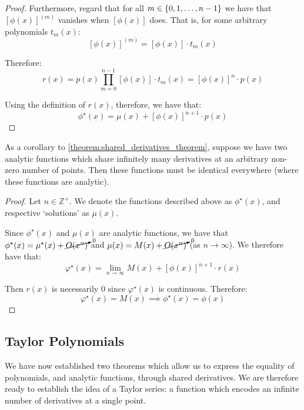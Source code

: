 \begin{theorem}
\begin{proof}
        Furthermore, regard that for all $m\in\{0,1,\dots,n-1\}$ we have that $[\phi(x)]^{(m)}$ vanishes when $[\phi(x)]$ does. That is, for some arbitrary polynomials $t_m(x)$:
        $$
            [\phi(x)]^{(m)}=[\phi(x)]\cdot t_m(x)
        $$

        Therefore:
        $$
            r(x) = p(x)\prod_{m=0}^{n-1}{[\phi(x)]\cdot t_{m}(x)} = [\phi(x)]^{n}\cdot p(x)
        $$

        Using the definition of $r(x)$, therefore, we have that:
        $$
            \phi^\star(x) = \mu(x) + [\phi(x)]^{n+1}\cdot p(x)
        $$
    \end{proof}
\end{theorem}

\begin{theorem}
    \label{theorem:analytic_function_equality}
    As a corollary to \ref{theorem:shared_derivatives_theorem}, suppose we have two analytic functions which share infinitely many derivatives at an arbitrary non-zero number of points. Then these functions must be identical everywhere (where these functions are analytic).

    \begin{proof}
        Let $n\in\mathbb{Z}^+$. We denote the functions described above as $\phi^\star(x)$, and respective `solutions' as $\mu(x)$.

        Since $\phi^\star(x)$ and $\mu(x)$ are analytic functions, we have that $\phi^\star(x)=\mu^\star(x)+\cancelto{0}{O(x^n)}$ and $\mu(x)=M(x)+\cancelto{0}{O(x^n)}$ (as $n\to\infty$). We therefore have that:
        $$
            \varphi^\star(x) = \lim_{n\to\infty}{M(x) + [\phi(x)]^{n+1}\cdot r(x)}
        $$

        Then $r(x)$ is necessarily $0$ since $\varphi^\star(x)$ is continuous. Therefore:
        $$
            \varphi^\star(x) = M(x) \implies \phi^\star(x) = \phi(x)
        $$
    \end{proof}
\end{theorem}

\subsection{Taylor Polynomials}
We have now established two theorems which allow us to express the equality of polynomials, and analytic functions, through shared derivatives. We are therefore ready to establish the idea of a Taylor series: a function which encodes an infinite number of derivatives at a single point.

